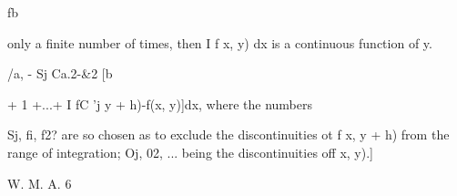 fb

only a finite number of times, then I f x, y) dx is a continuous
function of y.

/a, - Sj Ca.2-\&2 [b

+ 1 +...+ I fC 'j y + h)-f(x, y)]dx, where the numbers

Sj,   fi, f2?  are so chosen as to exclude the
discontinuities ot f x, y + h) from the range of integration; Oj, 02,
... being the discontinuities off x, y).] 

W. M. A. 6
